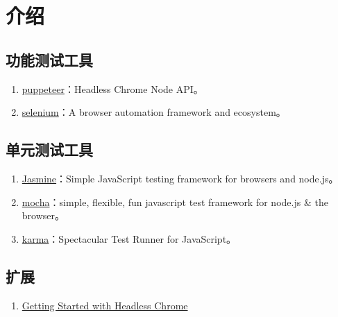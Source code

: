 \section{介绍}\label{ux4ecbux7ecd}

\subsection{功能测试工具}\label{ux529fux80fdux6d4bux8bd5ux5de5ux5177}

\begin{enumerate}
\def\labelenumi{\arabic{enumi}.}
\tightlist
\item
  \href{https://github.com/GoogleChrome/puppeteer}{puppeteer}：Headless
  Chrome Node API。
\item
  \href{https://github.com/SeleniumHQ/selenium}{selenium}：A browser
  automation framework and ecosystem。
\end{enumerate}

\subsection{单元测试工具}\label{ux5355ux5143ux6d4bux8bd5ux5de5ux5177}

\begin{enumerate}
\def\labelenumi{\arabic{enumi}.}
\tightlist
\item
  \href{https://github.com/jasmine/jasmine}{Jasmine}：Simple JavaScript
  testing framework for browsers and node.js。
\item
  \href{https://github.com/mochajs/mocha}{mocha}：simple, flexible, fun
  javascript test framework for node.js \& the browser。
\item
  \href{https://github.com/karma-runner/karma}{karma}：Spectacular Test
  Runner for JavaScript。
\end{enumerate}

\subsection{扩展}\label{ux6269ux5c55}

\begin{enumerate}
\def\labelenumi{\arabic{enumi}.}
\tightlist
\item
  \href{https://developers.google.cn/web/updates/2017/04/headless-chrome}{Getting
  Started with Headless Chrome}
\end{enumerate}
